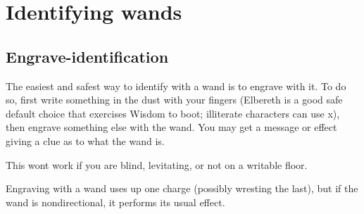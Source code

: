 \section{Identifying wands}
\label{11}
\subsection{Engrave-{}identification}
\label{12}
The easiest and safest way to identify with a wand is to engrave\footnotemark[140] with it. To do so, first write something in the dust with your fingers (Elbereth\footnotemark[141] is a good safe default choice that exercises Wisdom to boot; illiterate\footnotemark[142] characters can use x), then engrave something else with the wand. You may get a message or effect giving a clue as to what the wand is.


This won\textquotesingle{}t work if you are blind, levitating, or not on a writable floor.


Engraving with a wand uses up one charge (possibly wresting the last), but if the wand is nondirectional, it performs its usual effect.




